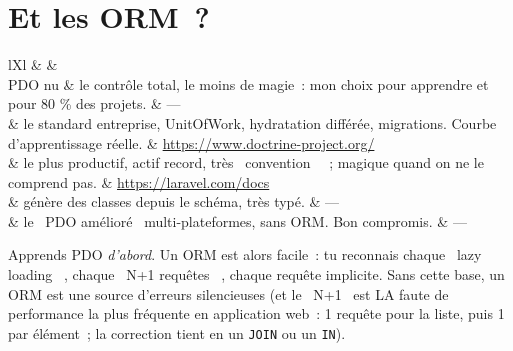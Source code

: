 \section{Et les ORM~?}

\begin{tabz}{lXl}
  \headrow {} \&  \&  \\
  \midrule
  PDO nu \& le contr\^ole total, le moins de magie~: mon choix pour apprendre et pour 80 \% des projets. \& --- \\
   \& le standard entreprise, UnitOfWork, hydratation diff\'er\'ee, migrations. Courbe d'apprentissage r\'eelle. \& \url{https://www.doctrine-project.org/} \\
   \& le plus productif, actif record, tr\`es \og ~convention~ \fg{}~; magique quand on ne le comprend pas. \& \url{https://laravel.com/docs} \\
   \& g\'en\`ere des classes depuis le sch\'ema, tr\`es typ\'e. \& --- \\
   \& le \og ~PDO am\'elior\'e~ \fg{} multi-plateformes, sans ORM. Bon compromis. \& --- \\
\end{tabz}

\begin{astuce}
Apprends PDO \emph{d'abord}. Un ORM est alors facile~: tu reconnais chaque \og ~lazy loading~ \fg{},
chaque \og ~N+1 requ\^etes~ \fg{}, chaque requ\^ete implicite. Sans cette base, un ORM est une source
d'erreurs silencieuses (et le \og ~N+1~ \fg{} est LA faute de performance la plus fr\'equente en
application web~: 1 requ\^ete pour la liste, puis 1 par \'el\'ement~; la correction tient en un
\verb|JOIN| ou un \verb|IN|).
\end{astuce}

